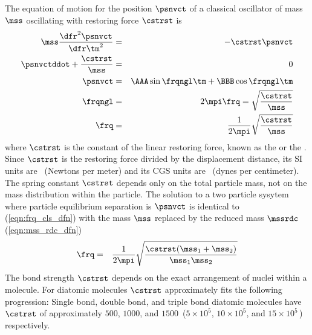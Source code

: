 \documentclass[12pt]{article}
\begin{document}
The equation of motion for the position $\psnvct$ of a classical
oscillator of mass $\mss$ oscillating with restoring force $\cstrst$
is 
\begin{eqnarray}
\mss \frac{\dfr^{2} \psnvct}{\dfr \tm^{2}} & = & -\cstrst \psnvct \nonumber \\
\psnvctddot + \frac{\cstrst}{\mss} & = & 0 \nonumber \\
\psnvct & = & \AAA \sin \frqngl \tm + \BBB \cos \frqngl \tm \nonumber \\
\frqngl & = & 2\mpi \frq = \sqrt{\frac{\cstrst}{\mss}} \nonumber \\
\frq & = & \frac{1}{2\mpi} \sqrt{\frac{\cstrst}{\mss}}
\label{eqn:frq_cls_dfn}
\end{eqnarray}
where $\cstrst$ is the constant of the linear restoring force,
known as the  or the .
Since $\cstrst$ is the restoring force divided by the displacement
distance, its SI units are \nxm\ (Newtons per meter) and its CGS
units are \dxcm\ (dynes per centimeter).
The spring constant $\cstrst$ depends only on the total particle mass, 
not on the mass distribution within the particle.
The solution to a two particle sysytem where particle equilibrium
separation is $\psnvct$ is identical to (\ref{eqn:frq_cls_dfn}) with
the mass $\mss$ replaced by the reduced mass $\mssrdc$
(\ref{eqn:mss_rdc_dfn})  
\begin{eqnarray}
\frq & = & \frac{1}{2\mpi} 
\sqrt{\frac{\cstrst(\mss_{1} + \mss_{2})}{\mss_{1} \mss_{2}}}
\label{eqn:frq_cls_dfn2}
\end{eqnarray}
The bond strength $\cstrst$ depends on the exact arrangement of 
nuclei within a molecule.
For diatomic molecules $\cstrst$ approximately fits the following
progression: 
Single bond, double bond, and triple bond diatomic molecules have
$\cstrst$ of  approximately $500$, $1000$, and $1500$\,\nxm
($5 \times 10^{5}$, $10 \times 10^{5}$, and $15 \times 10^{5}$\,\dxcm)
respectively.
\end{document}
